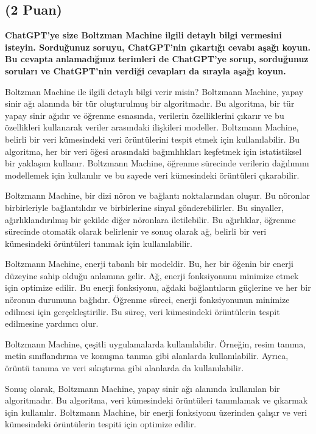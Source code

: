 \documentclass[11pt]{article}
\begin{document}
\subsection{(2 Puan)} \textbf{ChatGPT’ye size Boltzman Machine ilgili detaylı bilgi vermesini isteyin. Sorduğunuz soruyu, ChatGPT'nin çıkartığı cevabı aşağı koyun. Bu cevapta anlamadığınız terimleri de ChatGPT’ye sorup, sorduğunuz soruları ve ChatGPT’nin verdiği cevapları da sırayla aşağı koyun.}

\begin{dialogue}
 Boltzman Machine ile ilgili detaylı bilgi verir misin?
 Boltzmann Machine, yapay sinir ağı alanında bir tür oluşturulmuş bir algoritmadır. Bu algoritma, bir tür yapay sinir ağıdır ve öğrenme esnasında, verilerin özelliklerini çıkarır ve bu özellikleri kullanarak veriler arasındaki ilişkileri modeller. Boltzmann Machine, belirli bir veri kümesindeki veri örüntülerini tespit etmek için kullanılabilir. Bu algoritma, her bir veri öğesi arasındaki bağımlılıkları keşfetmek için istatistiksel bir yaklaşım kullanır. Boltzmann Machine, öğrenme sürecinde verilerin dağılımını modellemek için kullanılır ve bu sayede veri kümesindeki örüntüleri çıkarabilir.

Boltzmann Machine, bir dizi nöron ve bağlantı noktalarından oluşur. Bu nöronlar birbirleriyle bağlantılıdır ve birbirlerine sinyal gönderebilirler. Bu sinyaller, ağırlıklandırılmış bir şekilde diğer nöronlara iletilebilir. Bu ağırlıklar, öğrenme sürecinde otomatik olarak belirlenir ve sonuç olarak ağ, belirli bir veri kümesindeki örüntüleri tanımak için kullanılabilir.

Boltzmann Machine, enerji tabanlı bir modeldir. Bu, her bir öğenin bir enerji düzeyine sahip olduğu anlamına gelir. Ağ, enerji fonksiyonunu minimize etmek için optimize edilir. Bu enerji fonksiyonu, ağdaki bağlantıların güçlerine ve her bir nöronun durumuna bağlıdır. Öğrenme süreci, enerji fonksiyonunun minimize edilmesi için gerçekleştirilir. Bu süreç, veri kümesindeki örüntülerin tespit edilmesine yardımcı olur.

Boltzmann Machine, çeşitli uygulamalarda kullanılabilir. Örneğin, resim tanıma, metin sınıflandırma ve konuşma tanıma gibi alanlarda kullanılabilir. Ayrıca, örüntü tanıma ve veri sıkıştırma gibi alanlarda da kullanılabilir.

Sonuç olarak, Boltzmann Machine, yapay sinir ağı alanında kullanılan bir algoritmadır. Bu algoritma, veri kümesindeki örüntüleri tanımlamak ve çıkarmak için kullanılır. Boltzmann Machine, bir enerji fonksiyonu üzerinden çalışır ve veri kümesindeki örüntülerin tespiti için optimize edilir.
\end{dialogue}
\end{document}
